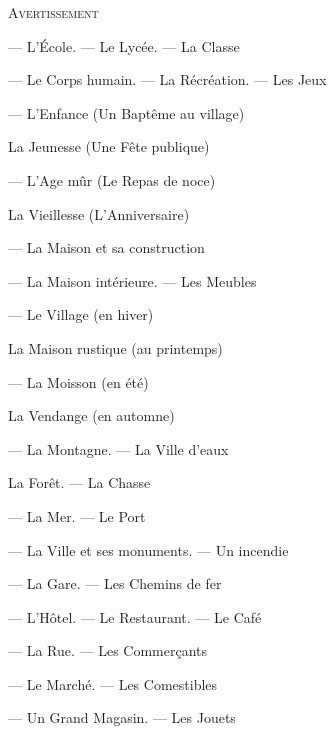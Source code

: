 \begin{VUpage}[93]{}
\VUsaut{3.0mm}
\VUsaut{2.4mm}
\VUfilet{20mm}
\VUsaut{8.0mm}

{\fontsize{10.2pt}{12.2pt}\selectfont
\noindent \textsc{Avertissement} 

\noindent {} --- L'École. --- Le Lycée. --- La Classe 

\noindent {} --- Le Corps humain. --- La Récréation. ---\nl
Les Jeux 

\noindent {} --- L'Enfance (Un Baptême au village) 

\noindent La Jeunesse (Une Fête publique) 

\noindent {} --- L'Age mûr (Le Repas de noce) 

\noindent La Vieillesse (L'Anniversaire) 

\noindent {} --- La Maison et sa construction 

\noindent {} --- La Maison intérieure. --- Les Meubles 

\noindent {} --- Le Village (en hiver) 

\noindent La Maison rustique (au printemps) 

\noindent {} --- La Moisson (en été) 

\noindent La Vendange (en automne) 

\noindent {} --- La Montagne. --- La Ville d'eaux 

\noindent La Forêt. --- La Chasse 

\noindent {} --- La Mer. --- Le Port 

\noindent {} --- La Ville et ses monuments. --- Un\nl
incendie 

\noindent {} --- La Gare. --- Les Chemins de fer 

\noindent {} --- L'Hôtel. --- Le Restaurant. --- Le Café 

\noindent {} --- La Rue. --- Les Commerçants 

\noindent {} --- Le Marché. --- Les Comestibles 

\noindent {} --- Un Grand Magasin. --- Les Jouets }

\VUsaut{6.0mm}
\VUfilet{20mm}
\end{VUpage}


